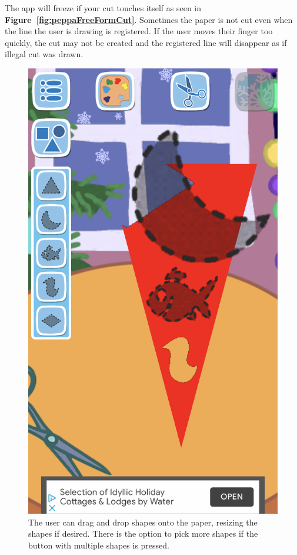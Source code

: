 \documentclass[11pt]{article}
\begin{document}
                     The app will freeze if your cut touches itself as seen in \textbf{Figure~\ref{fig:peppaFreeFormCut}}. Sometimes the paper is not cut even when the line the user is drawing is registered. If the user moves their finger too quickly, the cut may not be created and the registered line will disappear as if illegal cut was drawn.
                    
                    \begin{figure}[!ht]
                        \begin{minipage}{0.32\textwidth}
                            \centering \includegraphics[width=0.8\linewidth]{Images/peppa/peppaShapes.PNG}
                            \caption{The user can drag and drop shapes onto the paper, resizing the shapes if desired. There is the option to pick more shapes if the button with multiple shapes is pressed.}

\end{minipage}
\end{figure}
\end{document}
